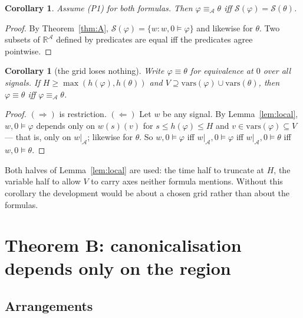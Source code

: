 \documentclass[11pt,a4paper]{article}
\theoremstyle{plain}
\newtheorem{corollary}[theorem]{Corollary}
\theoremstyle{definition}
\theoremstyle{remark}
\newcommand{\R}{\mathbb{R}}
\newcommand{\Sig}{\mathcal{S}}
\newcommand{\Ax}{\mathcal{A}}
\begin{document}
\begin{corollary}\label{cor:A1}
Assume \textup{(P1)} for both formulas. Then $\varphi \equiv_{\Ax} \theta$ iff
$\Sig(\varphi) = \Sig(\theta)$.
\end{corollary}

\begin{proof}
By Theorem~\ref{thm:A}, $\Sig(\varphi) = \{w : w,0 \models \varphi\}$ and
likewise for $\theta$. Two subsets of $\R^{\Ax}$ defined by predicates are equal
iff the predicates agree pointwise.
\end{proof}

\begin{corollary}[the grid loses nothing]\label{cor:A2}
Write $\varphi \equiv \theta$ for equivalence at $0$ over \emph{all} signals. If
$H \ge \max(h(\varphi),h(\theta))$ and $V \supseteq \mathrm{vars}(\varphi) \cup
\mathrm{vars}(\theta)$, then $\varphi \equiv \theta$ iff $\varphi \equiv_{\Ax}
\theta$.
\end{corollary}

\begin{proof}
$(\Rightarrow)$ is restriction. $(\Leftarrow)$ Let $w$ be any signal. By
Lemma~\ref{lem:local}, $w,0 \models \varphi$ depends only on $w(s)(v)$ for
$s \le h(\varphi) \le H$ and $v \in \mathrm{vars}(\varphi) \subseteq V$ --- that
is, only on $w|_{\Ax}$; likewise for $\theta$. So $w,0 \models \varphi$ iff
$w|_{\Ax},0 \models \varphi$ iff $w|_{\Ax},0 \models \theta$ iff
$w,0 \models \theta$.
\end{proof}

Both halves of Lemma~\ref{lem:local} are used: the time half to truncate at $H$,
the variable half to allow $V$ to carry axes neither formula mentions. Without
this corollary the development would be about a chosen grid rather than about the
formulas.

\section{Theorem B: canonicalisation depends only on the region}\label{sec:B}

\subsection{Arrangements}
\end{document}
